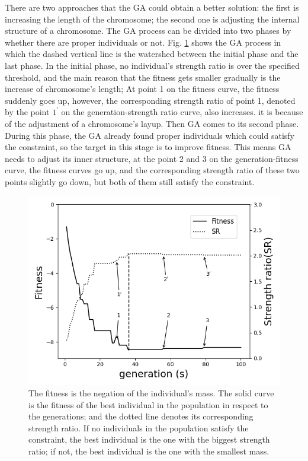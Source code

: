 There are two approaches that the GA could obtain a better solution: the first
is increasing the length of the chromosome; the second one is adjusting the
internal structure of a chromosome. The GA process can be divided into two
phases by whether there are proper individuals or not. Fig.
\ref{fig:sr} shows the GA process in which the dashed vertical line is the
watershed between the initial phase and the last phase. In the initial phase,
no individual's strength ratio is over the specified threshold, and the main
reason that the fitness gets smaller gradually is the increase of chromosome's
length; At point 1 on the fitness curve, the fitness suddenly goes up, however,
the corresponding strength ratio of point 1, denoted by the point $1^{\prime}$
on the generation-strength ratio curve, also increases. it is because of the
adjustment of a chromosome's layup.  Then GA comes to its second phase. During
this phase, the GA already found proper individuals which could satisfy the
constraint, so the target in this stage is to improve fitness. This means GA
needs to adjust its inner structure, at the point 2 and 3 on the
generation-fitness curve, the fitness curves go up, and the corresponding
strength ratio of these two points slightly go down, but both of them still
satisfy the constraint.
\begin{figure}[!b]
	\centering
	\includegraphics[width=\linewidth]{fig/fitness_strength_ratio.png}
	\caption{The fitness is the negation of the individual's mass. The solid
		curve is the fitness of the best individual in the population in respect
		to the generations; and the dotted line denotes its corresponding strength
		ratio. If no individuals in the population satisfy the constraint, the
		best individual is the one with the biggest strength ratio; if not, the
		best individual is the one with the smallest mass.
}
	\label{fig:sr}
\end{figure}

